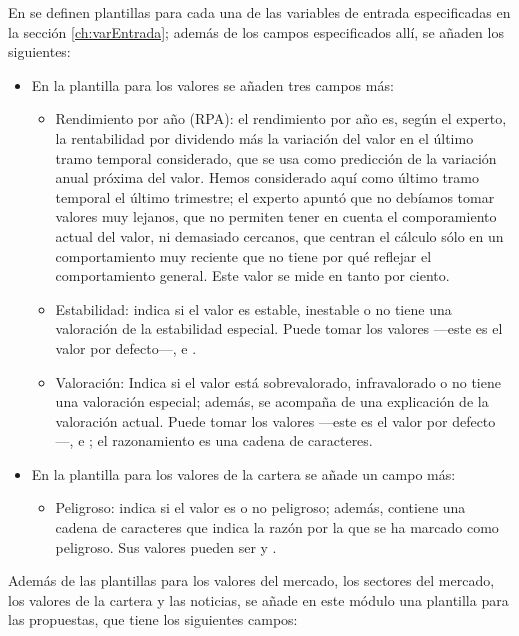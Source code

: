 \documentclass[a4paper, 11pt, titlepage]{article}
\begin{document}
    En  se definen plantillas para cada una de las variables de entrada especificadas en la sección \ref{ch:varEntrada}; además de los campos especificados allí, se añaden los siguientes:
    \begin{itemize}
        \item En la plantilla para los valores se añaden tres campos más:
        \begin{itemize}
            \item Rendimiento por año (RPA): el rendimiento por año es, según el experto, la rentabilidad por dividendo más la variación del valor en el último tramo temporal considerado, que se usa como predicción de la variación anual próxima del valor. Hemos considerado aquí como último tramo temporal el último trimestre; el experto apuntó que no debíamos tomar valores muy lejanos, que no permiten tener en cuenta el comporamiento actual del valor, ni demasiado cercanos, que centran el cálculo sólo en un comportamiento muy reciente que no tiene por qué reflejar el comportamiento general. Este valor se mide en tanto por ciento.
            \item Estabilidad: indica si el valor es estable, inestable o no tiene una valoración de la estabilidad especial. Puede tomar los valores  ---este es el valor por defecto---,  e .
            \item Valoración: Indica si el valor está sobrevalorado, infravalorado o no tiene una valoración especial; además, se acompaña de una explicación de la valoración actual. Puede tomar los valores  ---este es el valor por defecto---,  e ; el razonamiento es una cadena de caracteres.
        \end{itemize}
        \item En la plantilla para los valores de la cartera se añade un campo más:
        \begin{itemize}
            \item Peligroso: indica si el valor es o no peligroso; además, contiene una cadena de caracteres que indica la razón por la que se ha marcado como peligroso. Sus valores pueden ser  y .
        \end{itemize}
    \end{itemize}
    Además de las plantillas para los valores del mercado, los sectores del mercado, los valores de la cartera y las noticias, se añade en este módulo una plantilla para las propuestas, que tiene los siguientes campos:
\end{document}
